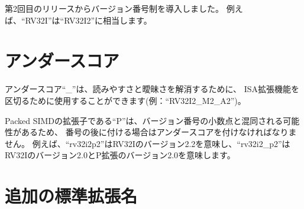 \begin{comment}
We introduced the version numbering scheme with the second release.  Hence, we
define the default version of a standard extension to be the version present at that
time, e.g., ``RV32I'' is equivalent to ``RV32I2''.
\end{comment}
第2回目のリリースからバージョン番号制を導入しました。
例えば、``RV32I''は``RV32I2''に相当します。

\begin{comment}
\section{Underscores}
\end{comment}
\section{アンダースコア}

\begin{comment}
Underscores ``\_'' may be used to separate ISA extensions to
improve readability and to provide disambiguation, e.g., ``RV32I2\_M2\_A2''.
\end{comment}
アンダースコア``\_''は、読みやすさと曖昧さを解消するために、
ISA拡張機能を区切るために使用することができます(例：``RV32I2\_M2\_A2'')。

\begin{comment}
Because the ``P'' extension for Packed SIMD can be confused for the decimal
point in a version number, it must be preceded by an underscore if it follows
a number.  For example, ``rv32i2p2'' means version 2.2 of RV32I, whereas
``rv32i2\_p2'' means version 2.0 of RV32I with version 2.0 of the P extension.
\end{comment}
Packed SIMDの拡張子である``P''は、バージョン番号の小数点と混同される可能性があるため、
番号の後に付ける場合はアンダースコアを付けなければなりません。
例えば、``rv32i2p2''はRV32Iのバージョン2.2を意味し、``rv32i2\_p2''はRV32Iのバージョン2.0とP拡張のバージョン2.0を意味します。

\begin{comment}
\section{Additional Standard Extension Names}
\end{comment}
\section{追加の標準拡張名}

